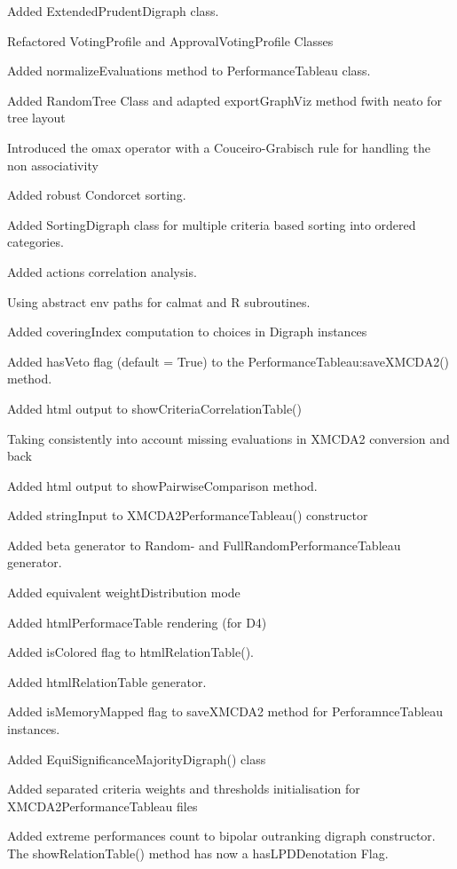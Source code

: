 \documentclass{article}
\newcommand{\+}{\verb+}
\renewcommand{\*}{\back{}}
\begin{document}
\begin{center}
\begin{menu}
\item Added ExtendedPrudentDigraph class.
\item Refactored VotingProfile and ApprovalVotingProfile Classes
\item Added normalizeEvaluations method to PerformanceTableau class.
\item Added RandomTree Class and adapted exportGraphViz method fwith neato for tree layout
\item Introduced the omax operator with a Couceiro-Grabisch rule for handling the non associativity
\item Added robust Condorcet sorting.
\item Added SortingDigraph class for multiple criteria based sorting into ordered categories.
\item Added actions correlation analysis.
\item Using abstract env paths for calmat and R subroutines.
\item Added coveringIndex computation to choices in Digraph instances
\item Added hasVeto flag (default = True) to the PerformanceTableau:saveXMCDA2() method.
\item Added html output to showCriteriaCorrelationTable()
\item Taking consistently into account missing evaluations in XMCDA2 conversion and back
\item Added html output to showPairwiseComparison method.
\item Added stringInput to XMCDA2PerformanceTableau() constructor
\item Added beta generator to Random- and FullRandomPerformanceTableau generator. 
\item Added equivalent weightDistribution mode
\item Added htmlPerformaceTable rendering (for D4)
\item Added isColored flag to htmlRelationTable().
\item Added htmlRelationTable generator.
\item Added isMemoryMapped flag to saveXMCDA2 method for PerforamnceTableau instances.
\item Added EquiSignificanceMajorityDigraph() class
\item Added separated criteria weights and thresholds initialisation for XMCDA2PerformanceTableau files
\item Added extreme performances count to bipolar outranking digraph constructor. The showRelationTable() method has now a hasLPDDenotation Flag.

\end{menu}
\end{center}
\end{document}
